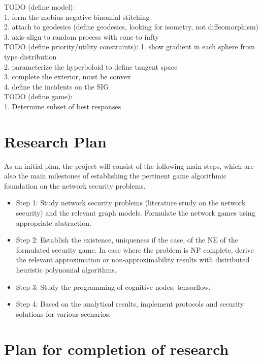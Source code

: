 \documentclass[10pt]{article}
\theoremstyle{definition}
\begin{document}
TODO (define model): \\
1. form the mobius negative binomial stitching\\
2. attach to geodesics (define geodesics, looking for isometry, not
diffeomorphism)\\
3. axis-align to random process with cone to infty\\

TODO (define priority/utility constraints): 
1. show gradient in each sphere from type distribution\\
2. parameterize the hyperboloid to define tangent space\\
3. complete the exterior, must be convex\\
4. define the incidents on the SIG\\

TODO (define game):\\
1. Determine subset of best responses\\

\section{Research Plan}


As an initial plan, the project will consist of the following main steps, which are also the main milestones of establishing the pertinent game algorithmic foundation on the network security problems.
\begin{itemize}
	\item Step 1: Study network security problems (literature study on the
    network security) and the relevant graph models. Formulate the network games using appropriate abstraction.
	\item Step 2: Establish the existence, uniqueness if the case, of the NE of the formulated security game. In case where the problem is NP complete, derive the relevant approximation or non-approximability results with distributed heuristic polynomial algorithms.
	\item Step 3: Study the programming of cognitive nodes, tensorflow.
	\item Step 4: Based on the analytical results, implement protocols and security solutions for various scenarios.
\end{itemize}


\section{Plan for completion of research}
\end{document}
